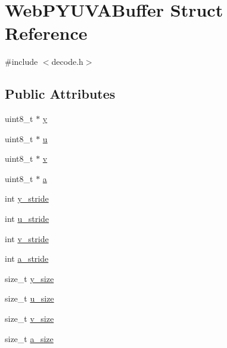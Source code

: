 \hypertarget{struct_web_p_y_u_v_a_buffer}{}\section{Web\+P\+Y\+U\+V\+A\+Buffer Struct Reference}
\label{struct_web_p_y_u_v_a_buffer}


{\ttfamily \#include $<$decode.\+h$>$}

\subsection*{Public Attributes}
\begin{DoxyCompactItemize}
\item 
uint8\+\_\+t $\ast$ \mbox{\hyperlink{struct_web_p_y_u_v_a_buffer_a910f78692b15d6f653570bd912728d9f}{y}}
\item 
uint8\+\_\+t $\ast$ \mbox{\hyperlink{struct_web_p_y_u_v_a_buffer_a6d856cfdedd47b15e8f59ed88e331030}{u}}
\item 
uint8\+\_\+t $\ast$ \mbox{\hyperlink{struct_web_p_y_u_v_a_buffer_a8a9a660a026e1e75202984b79f7dd7a3}{v}}
\item 
uint8\+\_\+t $\ast$ \mbox{\hyperlink{struct_web_p_y_u_v_a_buffer_ad211dd3ea4fd3d129995e7a9d1bf2594}{a}}
\item 
int \mbox{\hyperlink{struct_web_p_y_u_v_a_buffer_a8dc1351e8df61c8047f66a925c146f1a}{y\+\_\+stride}}
\item 
int \mbox{\hyperlink{struct_web_p_y_u_v_a_buffer_a9a70e1b48e90f32199afb44a91f1b289}{u\+\_\+stride}}
\item 
int \mbox{\hyperlink{struct_web_p_y_u_v_a_buffer_a4a47db587f41dbf943e73d897a4556c5}{v\+\_\+stride}}
\item 
int \mbox{\hyperlink{struct_web_p_y_u_v_a_buffer_abe0f9157f126938a5081c5fd3ee88a9d}{a\+\_\+stride}}
\item 
size\+\_\+t \mbox{\hyperlink{struct_web_p_y_u_v_a_buffer_a4e21661401eea84896b113018cf00592}{y\+\_\+size}}
\item 
size\+\_\+t \mbox{\hyperlink{struct_web_p_y_u_v_a_buffer_ae2dae1248a056f7753e218d0b2265f9b}{u\+\_\+size}}
\item 
size\+\_\+t \mbox{\hyperlink{struct_web_p_y_u_v_a_buffer_a8f87e462581975a52d690143a60c9143}{v\+\_\+size}}
\item 
size\+\_\+t \mbox{\hyperlink{struct_web_p_y_u_v_a_buffer_a1b229bd6f211fb1c579ec6ce26837aeb}{a\+\_\+size}}
\end{DoxyCompactItemize}



